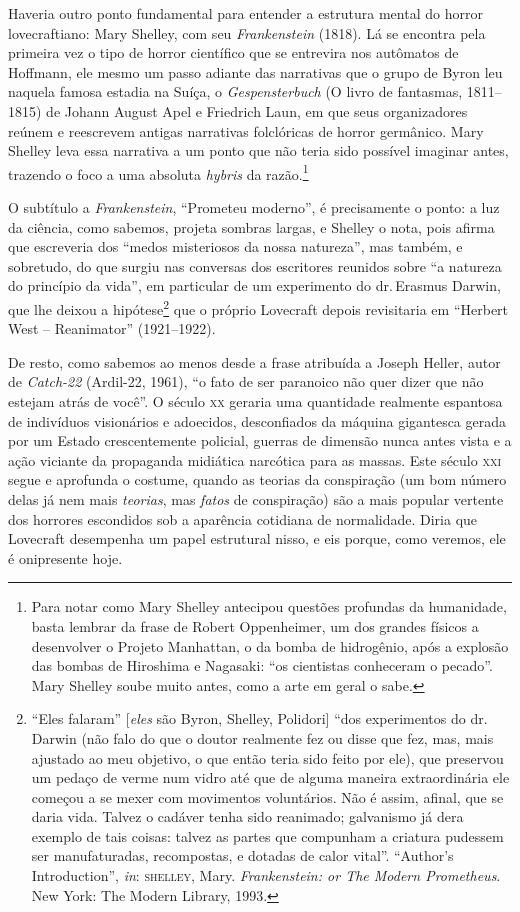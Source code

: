 Haveria outro ponto fundamental para entender a estrutura
mental do horror lovecraftiano: Mary Shelley, com seu
\emph{Frankenstein} (1818). Lá se encontra pela primeira vez o tipo de
horror científico que se entrevira nos autômatos de Hoffmann, ele mesmo
um passo adiante das narrativas que o grupo de Byron leu naquela famosa
estadia na Suíça, o \emph{Gespensterbuch} (O livro de fantasmas, 1811--1815)
de Johann August Apel e Friedrich Laun, em que seus organizadores reúnem
e reescrevem antigas narrativas folclóricas de horror germânico. Mary
Shelley leva essa narrativa a um ponto que não teria sido possível imaginar
antes, trazendo o foco a uma absoluta \emph{hybris} da razão.\footnote{Para
  notar como Mary Shelley antecipou questões profundas da humanidade,
  basta lembrar da frase de Robert Oppenheimer, um dos
  grandes físicos a desenvolver o Projeto Manhattan, o da bomba de
  hidrogênio, após a explosão das bombas de Hiroshima e Nagasaki: ``os
  cientistas conheceram o pecado''. Mary Shelley soube muito antes,
  como a arte em geral o sabe.}

O subtítulo a \emph{Frankenstein}, ``Prometeu moderno'', é precisamente
o ponto: a luz da ciência, como sabemos, projeta sombras largas, e
Shelley o nota, pois afirma que escreveria dos ``medos misteriosos da
nossa natureza'', mas também, e sobretudo, do que surgiu nas conversas
dos escritores reunidos sobre ``a natureza do princípio da vida'', em
particular de um experimento do dr.\,Erasmus Darwin, que lhe
deixou a hipótese\footnote{``Eles falaram'' {[}\emph{eles} são Byron,
  Shelley, Polidori{]} ``dos experimentos do dr.\,Darwin (não falo do que
  o doutor realmente fez ou disse que fez, mas, mais ajustado ao meu
  objetivo, o que então teria sido feito por ele), que preservou um
  pedaço de verme num vidro até que de alguma maneira extraordinária
  ele começou a se mexer com movimentos voluntários. Não é assim, afinal,
  que se daria vida. Talvez o cadáver tenha sido reanimado; galvanismo
  já dera exemplo de tais coisas: talvez as partes que compunham a
  criatura pudessem ser manufaturadas, recompostas, e dotadas de calor
  vital''. ``Author's Introduction'', \emph{in}: \textsc{shelley}, Mary.
  \emph{Frankenstein: or The Modern Prometheus}. New York: The Modern
  Library, 1993.} que o próprio Lovecraft depois revisitaria em
``Herbert West -- Reanimator'' (1921--1922).

De resto, como sabemos ao menos desde a frase atribuída a Joseph Heller,
autor de \emph{Catch-22} (Ardil-22, 1961), ``o fato de ser
paranoico não quer dizer que não estejam atrás de você''. O século \textsc{xx}
geraria uma quantidade realmente espantosa de indivíduos visionários e
adoecidos, desconfiados da máquina gigantesca gerada por um Estado
crescentemente policial, guerras de dimensão nunca antes vista e a ação
viciante da propaganda midiática narcótica para as massas. Este século
\textsc{xxi} segue e aprofunda o costume, quando as teorias da conspiração (um
bom número delas já nem mais \emph{teorias}, mas \emph{fatos} de
conspiração) são a mais popular vertente dos horrores escondidos sob a
aparência cotidiana de normalidade. Diria que Lovecraft desempenha um
papel estrutural nisso, e eis porque, como veremos, ele é onipresente
hoje.

